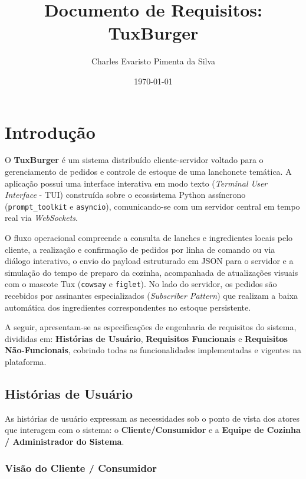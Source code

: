 \documentclass[12pt]{article}
\title{\textbf{Documento de Requisitos: TuxBurger}}
\author{Charles Evaristo Pimenta da Silva}
\date{\today}
\begin{document}
\maketitle

\section{Introdução}

O \textbf{TuxBurger} é um sistema distribuído cliente-servidor voltado para o gerenciamento de pedidos e controle de estoque de uma lanchonete temática. A aplicação possui uma interface interativa em modo texto (\textit{Terminal User Interface} - TUI) construída sobre o ecossistema Python assíncrono (\texttt{prompt\_toolkit} e \texttt{asyncio}), comunicando-se com um servidor central em tempo real via \textit{WebSockets}.

O fluxo operacional compreende a consulta de lanches e ingredientes locais pelo cliente, a realização e confirmação de pedidos por linha de comando ou via diálogo interativo, o envio do payload estruturado em JSON para o servidor e a simulação do tempo de preparo da cozinha, acompanhada de atualizações visuais com o mascote Tux (\texttt{cowsay} e \texttt{figlet}). No lado do servidor, os pedidos são recebidos por assinantes especializados (\textit{Subscriber Pattern}) que realizam a baixa automática dos ingredientes correspondentes no estoque persistente.

A seguir, apresentam-se as especificações de engenharia de requisitos do sistema, divididas em: \textbf{Histórias de Usuário}, \textbf{Requisitos Funcionais} e \textbf{Requisitos Não-Funcionais}, cobrindo todas as funcionalidades implementadas e vigentes na plataforma.

\subsection{Histórias de Usuário}

As histórias de usuário expressam as necessidades sob o ponto de vista dos atores que interagem com o sistema: o \textbf{Cliente/Consumidor} e a \textbf{Equipe de Cozinha / Administrador do Sistema}.

\subsubsection{Visão do Cliente / Consumidor}
\end{document}
